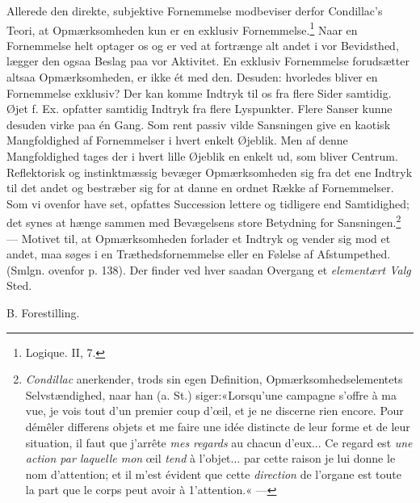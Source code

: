 \documentclass[12pt,a4paper,openany]{book}
\newcommand{\opage}[1]{\marginnote{\footnotesize\textit{[#1]}}}
\begin{document}
Allerede den direkte, subjektive Fornemmelse modbeviser derfor
Condillac’s Teori, at Opmærksomheden kun er en exklusiv
Fornemmelse.\footnote[2]{Logique. II, 7.} Naar en Fornemmelse helt
optager os og er ved at fortrænge alt andet i vor Bevidsthed, lægger den
ogsaa Beslag paa vor Aktivitet. En exklusiv Fornemmelse forudsætter
altsaa Opmærksomheden, er ikke ét med den. Desuden: hvorledes bliver en
Fornemmelse exklusiv? Der kan komme Indtryk til os fra flere Sider
samtidig. Øjet f. Ex. opfatter samtidig Indtryk fra flere Lyspunkter.
Flere Sanser kunne desuden virke paa én Gang. Som rent passiv vilde
Sansningen give en kaotisk Mangfoldighed af Fornemmelser i hvert enkelt
Øjeblik. Men af denne Mangfoldighed tages der i hvert lille Øjeblik en
enkelt ud, som bliver Centrum. Reflektorisk og instinktmæssig bevæger
Opmærksomheden sig fra det ene Indtryk til det andet og bestræber sig
for at danne en ordnet Række af Fornemmelser. Som vi ovenfor have set,
opfattes Succession lettere og tidligere end Samtidighed; det synes at
hænge sammen med Bevægelsens store Betydning for
Sansningen.\footnote[3]{\emph{Condillac} anerkender, trods sin egen
Definition, Opmærksomhedselementets Selvstændighed, naar han (a. St.)
siger:«Lorsqu’une campagne s’offre à ma vue, je vois tout d’un premier
coup d’œil, et je ne discerne rien encore. Pour démêler differens objets
et me faire une idée distincte de leur forme et de leur situation, il
faut que j’arrête \emph{mes regards} au chacun d’eux... Ce regard est
\emph{une action par laquelle mon} œil \emph{tend} à l’objet... par
cette raison je lui donne le nom d’attention; et il m’est évident que
cette \emph{direction} de l’organe est toute la part que le corps peut
avoir à 1’attention.« ---} --- Motivet til, at Opmærksomheden forlader
et
\opage{150}Indtryk og vender sig mod et andet, maa søges i en
Træthedsfornemmelse eller en Følelse af Afstumpethed. (Smlgn. ovenfor p.
138). Der finder ved hver saadan Overgang et \emph{elementært Valg}
Sted.

\begin{center}B. Forestilling.\end{center}
\end{document}
